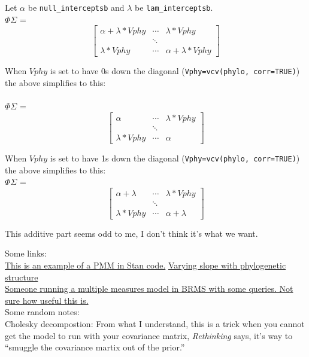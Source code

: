 \documentclass[11pt,letter]{article}
\begin{document}
Let $\alpha$ be  \verb|null_interceptsb| and $\lambda$ be \verb|lam_interceptsb|.\\

$\Phi\Sigma$ = 
\begin{equation}
 \begin{bmatrix}
  \alpha+\lambda*Vphy &  \cdots & \lambda*Vphy \\
   & \ddots \\
  \lambda*Vphy & \cdots &   \alpha+\lambda*Vphy
 \end{bmatrix}
\end{equation}

\vspace{2ex}
When $Vphy$ is set to have 0s down the diagonal (\verb|Vphy=vcv(phylo, corr=TRUE)|) the above simplifies to this:\\
\\

$\Phi\Sigma$ = 
\begin{equation}
 \begin{bmatrix}
  \alpha &  \cdots & \lambda*Vphy \\
   & \ddots \\
  \lambda*Vphy & \cdots &   \alpha
 \end{bmatrix}
\end{equation}

\vspace{2ex}
When $Vphy$ is set to have 1s down the diagonal (\verb|Vphy=vcv(phylo, corr=TRUE)|) the above simplifies to this:\\

$\Phi\Sigma$ = 
\begin{equation}
 \begin{bmatrix}
  \alpha+\lambda &  \cdots & \lambda*Vphy \\
   & \ddots \\
  \lambda*Vphy & \cdots &   \alpha+\lambda
 \end{bmatrix}
\end{equation}

\vspace{2ex}
This additive part seems odd to me, I don't think it's what we want.


\clearpage
Some links:\\
\href{https://groups.google.com/forum/#!topic/stan-users/Irv9RWDCpQE}{This is an example of a PMM in Stan code.}
\href{https://discourse.mc-stan.org/t/varying-slope-with-phylogenetic-structure/5739/4}{Varying slope with phylogenetic structure}\\
\href{https://discourse.mc-stan.org/t/multivariate-phylogenetic-with-repeated-measurements-model-help/14359/6}{Someone running a multiple measures model in BRMS with some queries. Not sure how useful this is.}\\

Some random notes:\\
Cholesky decompostion: From what I understand, this is a trick when you cannot get the model to run with your covariance matrix, \emph{Rethinking} says, it's way to ``smuggle the covariance martix out of the prior.''
\end{document}
